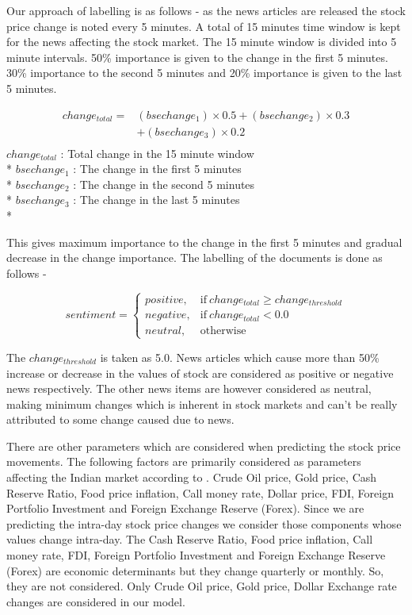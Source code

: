 \documentclass[review,twocolumn,5p]{elsarticle}
\begin{document}
Our approach of labelling is as follows - as the news articles are released the stock price change is noted every 5 minutes. A total of 15 minutes time window is kept for the news affecting the stock market. The 15 minute window is divided into 5 minute intervals. 50\% importance is given to the change in the first 5 minutes. 30\% importance to the second 5 minutes and 20\% importance is given to the last 5 minutes.
 
\begin{equation}
\begin{array}{ll}
change_{total} = & ( bsechange_{1} ) \times 0.5 + ( bsechange_{2} ) \times 0.3 \\
    & + ( bsechange_{3} ) \times 0.2 \\
\end{array}
\end{equation}
$change_{total}$ : Total change in the 15 minute window \\*
$bsechange_{1}$ : The change in the first 5 minutes \\*
$bsechange_{2}$ : The change in the second 5 minutes \\*
$bsechange_{3}$ : The change in the last 5 minutes \\*

This gives maximum importance to the change in the first 5 minutes and gradual decrease in the change importance. The labelling of the documents is done as follows - 

\begin{equation}
sentiment=
	\begin{cases}
		positive, & \text{if}\ change_{total} \geq change_{threshold} \\
		negative, & \text{if}\ change_{total} < 0.0 \\
     	neutral, & \text{otherwise}
	\end{cases}
\end{equation}

The $change_{threshold}$ is taken as 5.0. News articles which cause more than 50\% increase or decrease in the values of stock are considered as positive or negative news respectively. The other news items are however considered as neutral, making minimum changes which is inherent in stock markets and can't be really attributed to some change caused due to news. 

There are other parameters which are considered when predicting the stock price movements. The following factors are primarily considered as parameters affecting the Indian market according to \cite{ghosh:2010}. Crude Oil price, Gold price, Cash Reserve Ratio, Food price inflation, Call money rate, Dollar price, FDI, Foreign Portfolio Investment and Foreign Exchange Reserve (Forex). Since we are predicting the intra-day stock price changes we consider those components whose values change intra-day. The Cash Reserve Ratio, Food price inflation, Call money rate, FDI, Foreign Portfolio Investment and Foreign Exchange Reserve (Forex) are economic determinants but they change quarterly or monthly. So, they are not considered. Only Crude Oil price, Gold price, Dollar Exchange rate changes are considered in our model. 
\end{document}
